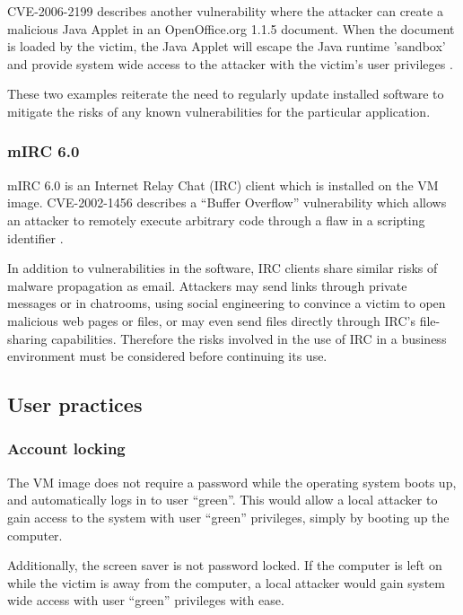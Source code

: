 CVE-2006-2199 describes another vulnerability where the attacker can create a malicious Java Applet in an OpenOffice.org 1.1.5 document. When the document is loaded by the victim, the Java Applet will escape the Java runtime 'sandbox' and provide system wide access to the attacker with the victim's user privileges \citep{MITRE2006b, SecurityTracker2006}.

These two examples reiterate the need to regularly update installed software to mitigate the risks of any known vulnerabilities for the particular application.

\subsubsection{mIRC 6.0}

mIRC 6.0 is an Internet Relay Chat (IRC) client which is installed on the VM image. CVE-2002-1456 describes a ``Buffer Overflow'' vulnerability which allows an attacker to remotely execute arbitrary code through a flaw in a scripting identifier \citep{MITRE2003, Martin2002}.

In addition to vulnerabilities in the software, IRC clients share similar risks of malware propagation as email. Attackers may send links through private messages or in chatrooms, using social engineering to convince a victim to open malicious web pages or files, or may even send files directly through IRC's file-sharing capabilities. Therefore the risks involved in the use of IRC in a business environment must be considered before continuing its use.

\subsection{User practices}

\subsubsection{Account locking}

The VM image does not require a password while the operating system boots up, and automatically logs in to user ``green''. This would allow a local attacker to gain access to the system with user ``green'' privileges, simply by booting up the computer.

Additionally, the screen saver is not password locked. If the computer is left on while the victim is away from the computer, a local attacker would gain system wide access with user ``green'' privileges with ease.

